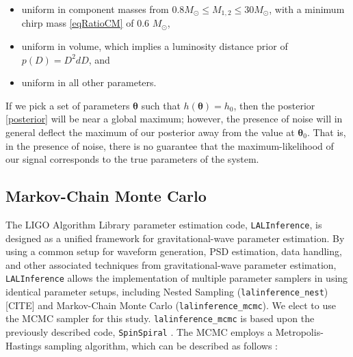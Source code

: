 \documentclass[11pt,a4paper]{emulateapj}
\newcommand{\carl}[1]{{\color{red}  #1}}
\newcommand{\thpara}{\boldsymbol{\theta}}
\begin{document}
\begin{itemize}
\item uniform in component masses from $0.8M_{\odot} \leq M_{1,2} \leq 30M_{\odot}$, with a minimum chirp mass  \eqref{eqRatioCM} of 0.6 $M_{\odot}$,
\item uniform in volume, which implies a luminosity distance prior of $p(D) = D^2 dD$, and
\item uniform in all other parameters.
\end{itemize}

If we pick a set of parameters $\thpara$ such that
$h(\thpara) = h_0$, then the posterior \eqref{posterior}
will be near a global maximum; however, the presence of noise will in
general deflect the maximum of our posterior away from the value at
$\thpara_0$. That is, in the presence of noise, there is
no guarantee that the maximum-likelihood of our signal corresponds to
the true parameters of the system. 

  
\subsection{Markov-Chain Monte Carlo}
\label{MCMCSection}
  
The LIGO Algorithm Library parameter estimation code, \texttt{LALInference}, is designed as 
a unified framework for gravitational-wave parameter estimation.  By using a common setup for 
waveform generation, PSD estimation, data handling, and other associated techniques from gravitational-wave parameter estimation, \texttt{LALInference} allows the implementation of multiple parameter samplers in using identical parameter setups, including Nested Sampling (\texttt{lalinference\_nest})\carl{[CITE]} and Markov-Chain Monte Carlo (\texttt{lalinference\_mcmc}).  We elect to use the MCMC sampler for this study.  \texttt{lalinference\_mcmc} is based upon the previously described code, 
\texttt{SpinSpiral} \citep{spinspiral2009, spinspiral2010}.  The MCMC employs a Metropolis-Hastings sampling algorithm, which can be described as follows \citep{Gilks99}:
  
\end{document}
